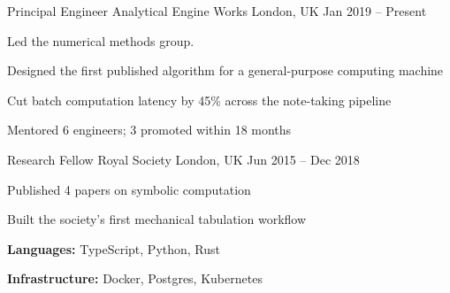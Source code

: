 \documentclass[]{awesome-cv}
\begin{document}
    \vspace{-2mm}
      \vspace{3pt}
      \begin{cventries}
      \cventry
            {Principal Engineer}
            {Analytical Engine Works}
            {London, UK}
            {Jan 2019 – Present}
            {Led the numerical methods group.\endgraf\vspace{4mm}\begin{cvitems}
  \setlength\itemsep{2pt}
  \item {Designed the first published algorithm for a general-purpose computing machine}
  \item {Cut batch computation latency by 45\% across the note-taking pipeline}
  \item {Mentored 6 engineers; 3 promoted within 18 months}
\end{cvitems}}
      \cventry
            {Research Fellow}
            {Royal Society}
            {London, UK}
            {Jun 2015 – Dec 2018}
            {\begin{cvitems}
  \setlength\itemsep{2pt}
  \item {Published 4 papers on symbolic computation}
  \item {Built the society's first mechanical tabulation workflow}
\end{cvitems}}
      \end{cventries}
\vspace{3pt}
\begin{cventries}
\cventry
{}
{\begin{cvitems}
\setlength\itemsep{2pt}
\item {\textbf{Languages:} TypeScript, Python, Rust}
\item {\textbf{Infrastructure:} Docker, Postgres, Kubernetes}
\end{cvitems}}
{}
{}
{}
\end{cventries}
\end{document}
